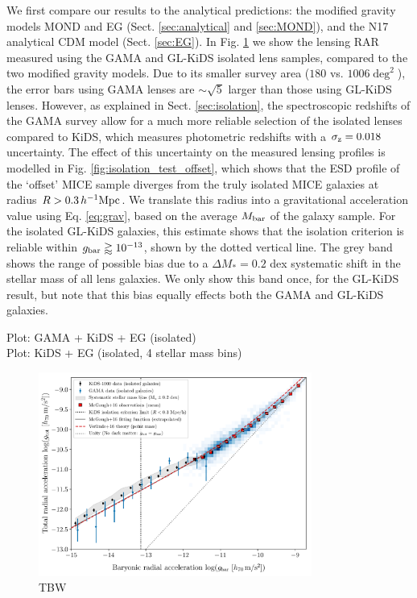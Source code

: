 \documentclass[usenatbib]{mnras}
\newcommand{\hMpc}{\, h^{-1}{\rm{Mpc}} }
\newcommand{\un}[1]{_{\rm #1}}
\begin{document}
We first compare our results to the analytical predictions: the modified gravity models MOND and EG (Sect. \ref{sec:analytical} and \ref{sec:MOND}), and the N17 analytical CDM model (Sect. \ref{sec:EG}). In Fig. \ref{fig:RAR_kids_gama_iso} we show the lensing RAR measured using the GAMA and GL-KiDS isolated lens samples, compared to the two modified gravity models. Due to its smaller survey area ($180$ vs. $1006 \deg^2$), the error bars using GAMA lenses are $\sim\sqrt{5}$ larger than those using GL-KiDS lenses. However, as explained in Sect. \ref{sec:isolation}, the spectroscopic redshifts of the GAMA survey allow for a much more reliable selection of the isolated lenses compared to KiDS, which measures photometric redshifts with a $\sigma\un{z}=0.018$ uncertainty. The effect of this uncertainty on the measured lensing profiles is modelled in Fig. \ref{fig:isolation_test_offset}, which shows that the ESD profile of the `offset' MICE sample diverges from the truly isolated MICE galaxies at radius $R > 0.3 \hMpc$. We translate this radius into a gravitational acceleration value using Eq. \ref{eq:grav}, based on the average $M\un{bar}$ of the galaxy sample. For the isolated GL-KiDS galaxies, this estimate shows that the isolation criterion is reliable within $g\un{bar} \gtrapprox 10^{-13}$, shown by the dotted vertical line. The grey band shows the range of possible bias due to a $\Delta M_*=0.2$ dex systematic shift in the stellar mass of all lens galaxies. We only show this band once, for the GL-KiDS result, but note that this bias equally effects both the GAMA and GL-KiDS galaxies. 


Plot: GAMA + KiDS + EG (isolated) \\
Plot: KiDS + EG (isolated, 4 stellar mass bins)

\begin{figure}
	\includegraphics[width=0.8\textwidth]{Figures/RAR_KiDS+GAMA+Verlinde_Nobins_isolated_zoomout.pdf}
	\caption{TBW}
	\label{fig:RAR_kids_gama_iso}
\end{figure}
\end{document}

